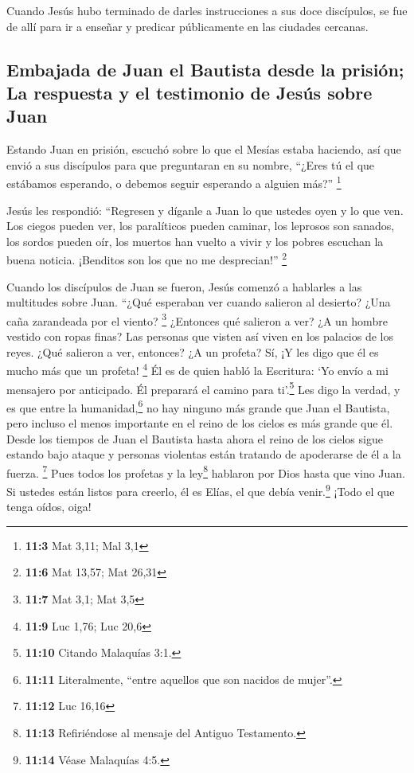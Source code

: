  Cuando Jesús hubo terminado de darles instrucciones a sus
doce discípulos, se fue de allí para ir a enseñar y predicar
públicamente en las ciudades cercanas.

\hypertarget{embajada-de-juan-el-bautista-desde-la-prisiuxf3n-la-respuesta-y-el-testimonio-de-jesuxfas-sobre-juan}{%
\subsection{Embajada de Juan el Bautista desde la prisión; La respuesta
y el testimonio de Jesús sobre
Juan}\label{embajada-de-juan-el-bautista-desde-la-prisiuxf3n-la-respuesta-y-el-testimonio-de-jesuxfas-sobre-juan}}

 Estando Juan en prisión, escuchó sobre lo que el Mesías
estaba haciendo, así que envió a sus discípulos  para que
preguntaran en su nombre, ``¿Eres tú el que estábamos esperando, o
debemos seguir esperando a alguien más?'' \footnote{\textbf{11:3} Mat
  3,11; Mal 3,1}

 Jesús les respondió: ``Regresen y díganle a Juan lo que
ustedes oyen y lo que ven.  Los ciegos pueden ver, los
paralíticos pueden caminar, los leprosos son sanados, los sordos pueden
oír, los muertos han vuelto a vivir y los pobres escuchan la buena
noticia.  ¡Benditos son los que no me desprecian!''
\footnote{\textbf{11:6} Mat 13,57; Mat 26,31}

 Cuando los discípulos de Juan se fueron, Jesús comenzó a
hablarles a las multitudes sobre Juan. ``¿Qué esperaban ver cuando
salieron al desierto? ¿Una caña zarandeada por el viento? \footnote{\textbf{11:7}
  Mat 3,1; Mat 3,5}  ¿Entonces qué salieron a ver? ¿A un
hombre vestido con ropas finas? Las personas que visten así viven en los
palacios de los reyes.  ¿Qué salieron a ver, entonces? ¿A
un profeta? Sí, ¡Y les digo que él es mucho más que un profeta!
\footnote{\textbf{11:9} Luc 1,76; Luc 20,6}  Él es de
quien habló la Escritura: `Yo envío a mi mensajero por anticipado. Él
preparará el camino para ti'.\footnote{\textbf{11:10} Citando Malaquías
  3:1.}  Les digo la verdad, y es que entre la
humanidad,\footnote{\textbf{11:11} Literalmente, ``entre aquellos que
  son nacidos de mujer''.} no hay ninguno más grande que Juan el
Bautista, pero incluso el menos importante en el reino de los cielos es
más grande que él.  Desde los tiempos de Juan el Bautista
hasta ahora el reino de los cielos sigue estando bajo ataque y personas
violentas están tratando de apoderarse de él a la fuerza. \footnote{\textbf{11:12}
  Luc 16,16}  Pues todos los profetas y la ley\footnote{\textbf{11:13}
  Refiriéndose al mensaje del Antiguo Testamento.} hablaron por Dios
hasta que vino Juan.  Si ustedes están listos para
creerlo, él es Elías, el que debía venir.\footnote{\textbf{11:14} Véase
  Malaquías 4:5.}  ¡Todo el que tenga oídos, oiga!

